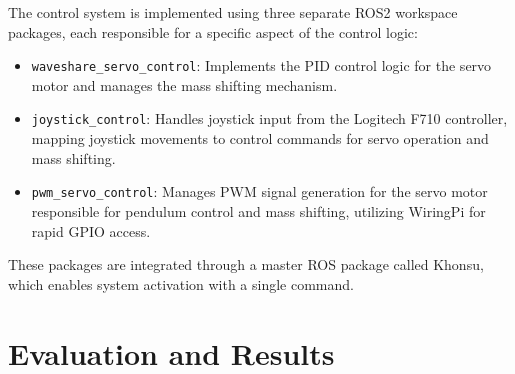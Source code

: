 \documentclass[english, bachelor, utf8]{base/thesis_telematics}
\begin{document}
The control system is implemented using three separate ROS2 workspace packages, each responsible for a specific aspect of the control logic:
\begin{itemize}
    \item \texttt{waveshare\_servo\_control}: Implements the PID control logic for the servo motor and manages the mass shifting mechanism.
    \item \texttt{joystick\_control}: Handles joystick input from the Logitech F710 controller, mapping joystick movements to control commands for servo operation and mass shifting.
    \item \texttt{pwm\_servo\_control}: Manages PWM signal generation for the servo motor responsible for pendulum control and mass shifting, utilizing WiringPi for rapid GPIO access.
\end{itemize}
These packages are integrated through a master ROS package called Khonsu, which enables system activation with a single command.

\chapter{Evaluation and Results}
\end{document}
